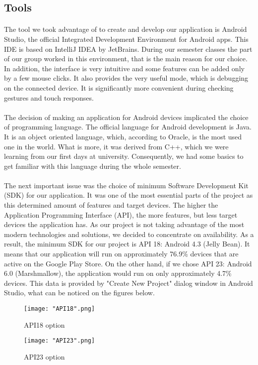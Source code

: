 \documentclass[12pt]{article}
\begin{document}
\subsection{Tools}
\paragraph{} The tool we took advantage of to create and develop our application is Android Studio, the official Integrated Development Environment for Android apps. This IDE is based on IntelliJ IDEA by JetBrains. During our semester classes the part of our group worked in this environment, that is the main reason for our choice. In addition, the interface is very intuitive and some features can be added only by a few mouse clicks. It also provides the very useful mode, which is debugging on the connected device. It is significantly more convenient during checking gestures and touch responses.
\paragraph{} The decision of making an application for Android devices implicated the choice of programming language. The official language for Android development is Java. It is an object oriented language, which, according to Oracle, is the most used one in the world. What is more, it was derived from C++, which we were learning from our first days at university. Consequently, we had some basics to get familiar with this language during the whole semester.
\paragraph{} The next important issue was the choice of minimum Software Development Kit (SDK) for our application. It was one of the most essential parts of the project as this determined amount of features and target devices. The higher the Application Programming Interface (API), the more features, but less target devices the application has. As our project is not taking advantage of the most modern technologies and solutions, we decided to concentrate on availability. As a result, the minimum SDK for our project is API 18: Android 4.3 (Jelly Bean). It means that our application will run on approximately 76.9\% devices that are active on the Google Play Store. 
On the other hand, if we chose API 23: Android 6.0 (Marshmallow), the application would run on only approximately 4.7\% devices. This data is provided by "Create New Project" dialog window in Android Studio, what can be noticed on the figures below.
\begin{figure}[H]
\texttt{[image: "API18".png]}
\caption{API18 option}
\label{fig:API18}
\end{figure}
\begin{figure}[H]
\texttt{[image: "API23".png]}
\caption{API23 option}
\label{fig:API23}
\end{figure}
\end{document}
